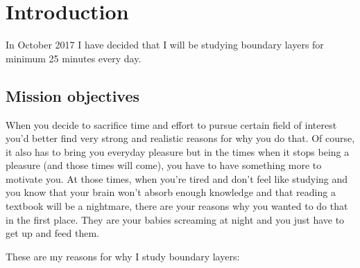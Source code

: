 \documentclass[12pt]{report}
\begin{document}

\setlength{\parindent}{0cm}

\clearpage


\tableofcontents



\setlength{\parskip}{1em}
\renewcommand{\baselinestretch}{1.0}


\newpage


\chapter{Introduction} \label{chap:intro}

In October 2017 I have decided that I will be studying boundary layers for minimum 25 minutes every day.


\section{Mission objectives} \label{chap:objectives}

When you decide to sacrifice time and effort to pursue certain field of interest you'd better find very strong and realistic reasons for why you do that. Of course, it also has to bring you everyday pleasure but in the times when it stops being a pleasure (and those times will come), you have to have something more to motivate you. At those times, when you're tired and don't feel like studying and you know that your brain won't absorb enough knowledge and that reading a textbook will be a nightmare, there are your reasons why you wanted to do that in the first place. They are your babies screaming at night and you just have to get up and feed them.

These are my reasons for why I study boundary layers:
\end{document}
